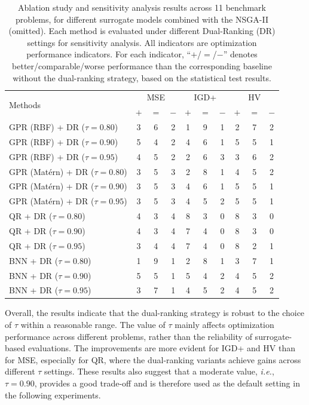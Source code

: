 \documentclass{article}
\begin{document}
\begin{table}[htbp]
\caption{Ablation study and sensitivity analysis results across 11 benchmark problems, for different surrogate models combined with the NSGA-II (omitted). Each method is evaluated under different Dual-Ranking (DR) settings for sensitivity analysis. 
All indicators are optimization performance indicators. For each indicator, ``$+$/$=$/$-$'' denotes better/comparable/worse performance than the corresponding baseline without the dual-ranking strategy, based on the statistical test results.}
\label{tab:opt_counts}
\centering
\begin{tabular}{l|ccc|ccc|ccc}
\hline
\multirow{2}{*}{Methods} 
& \multicolumn{3}{c|}{MSE} 
& \multicolumn{3}{c|}{IGD+} 
& \multicolumn{3}{c}{HV} \\
 & $+$ & $=$ & $-$ & $+$ & $=$ & $-$ & $+$ & $=$ & $-$ \\
\hline
GPR (RBF) + DR ($\tau{=}0.80$) & 3 & 6 & 2 & 1 & 9 & 1 & 2 & 7 & 2 \\
GPR (RBF) + DR ($\tau{=}0.90$) & 5 & 4 & 2 & 4 & 6 & 1 & 5 & 5 & 1 \\
GPR (RBF) + DR ($\tau{=}0.95$) & 4 & 5 & 2 & 2 & 6 & 3 & 3 & 6 & 2 \\

\hline
GPR (Mat\'ern) + DR ($\tau{=}0.80$) & 3 & 5 & 3 & 2 & 8 & 1 & 4 & 5 & 2 \\
GPR (Mat\'ern) + DR ($\tau{=}0.90$) & 3 & 5 & 3 & 4 & 6 & 1 & 5 & 5 & 1 \\
GPR (Mat\'ern) + DR ($\tau{=}0.95$) & 3 & 5 & 3 & 4 & 5 & 2 & 5 & 5 & 1 \\
\hline
QR + DR ($\tau{=}0.80$) & 4 & 3 & 4 & 8 & 3 & 0 & 8 & 3 & 0 \\
QR + DR ($\tau{=}0.90$) & 4 & 3 & 4 & 7 & 4 & 0 & 8 & 3 & 0 \\
QR + DR ($\tau{=}0.95$) & 3 & 4 & 4 & 7 & 4 & 0 & 8 & 2 & 1 \\
\hline
BNN + DR ($\tau{=}0.80$) & 1 & 9 & 1 & 2 & 8 & 1 & 3 & 7 & 1 \\
BNN + DR ($\tau{=}0.90$) & 5 & 5 & 1 & 5 & 4 & 2 & 4 & 5 & 2 \\
BNN + DR ($\tau{=}0.95$) & 3 & 7 & 1 & 4 & 5 & 2 & 4 & 5 & 2 \\
\hline
\end{tabular}
\end{table}

Overall, the results indicate that the dual-ranking strategy is robust to the choice of $\tau$ within a reasonable range. The value of $\tau$ mainly affects optimization performance across different problems, rather than the reliability of surrogate-based evaluations. The improvements are more evident for IGD+ and HV than for MSE, especially for QR, where the dual-ranking variants achieve gains across different $\tau$ settings. These results also suggest that a moderate value, \emph{i.e.}, $\tau=0.90$, provides a good trade-off and is therefore used as the default setting in the following experiments.
\end{document}

